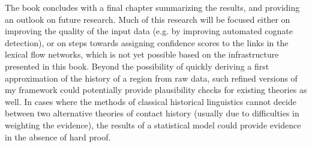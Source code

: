 The book concludes with a final chapter summarizing the results, and providing an outlook on future research. Much of this research will be focused either on improving the quality of the input data (e.g. by improving automated cognate detection), or on steps towards assigning confidence scores to the links in the lexical flow networks, which is not yet possible based on the infrastructure presented in this book. Beyond the possibility of quickly deriving a first approximation of the history of a region from raw data, such refined versions of my framework could potentially provide plausibility checks for existing theories as well. In cases where the methods of classical historical linguistics cannot decide between two alternative theories of contact history (usually due to difficulties in weighting the evidence), the results of a statistical model could provide evidence in the absence of hard proof.
